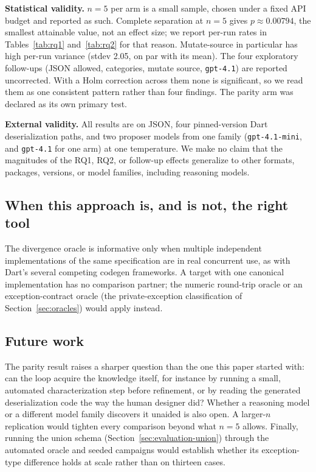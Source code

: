 \textbf{Statistical validity.} $n{=}5$ per arm is a small sample, chosen
under a fixed API budget and reported as such. Complete separation at
$n{=}5$ gives $p \approx 0.00794$, the smallest attainable value, not an
effect size; we report per-run rates in Tables~\ref{tab:rq1}
and~\ref{tab:rq2} for that reason. Mutate-source in particular has high
per-run variance (stdev 2.05, on par with its mean). The four exploratory
follow-ups (JSON allowed, categories, mutate source, \texttt{gpt-4.1}) are
reported uncorrected. With a Holm correction across them none is
significant, so we read them as one consistent pattern rather than four
findings. The parity arm was declared as its own primary test.

\textbf{External validity.} All results are on JSON, four pinned-version
Dart deserialization paths, and two proposer models from one family
(\texttt{gpt-4.1-mini}, and \texttt{gpt-4.1} for one arm) at one
temperature. We make no claim that the magnitudes of the RQ1, RQ2, or
follow-up effects generalize to other formats, packages, versions, or
model families, including reasoning models.

\subsection{When this approach is, and is not, the right tool}
The divergence oracle is informative only when multiple independent
implementations of the same specification are in real concurrent use, as
with Dart's several competing codegen frameworks. A target with one
canonical implementation has no comparison partner; the numeric round-trip
oracle or an exception-contract oracle (the private-exception classification
of Section~\ref{sec:oracles}) would apply instead.

\subsection{Future work}
\label{sec:future-work}
The parity result raises a sharper question than the one this paper started
with: can the loop acquire the knowledge itself, for instance by running a
small, automated characterization step before refinement, or by reading the
generated deserialization code the way the human designer did? Whether a
reasoning model or a different model family discovers it unaided is also
open. A larger-$n$ replication would tighten every comparison beyond what
$n{=}5$ allows. Finally, running the union schema
(Section~\ref{sec:evaluation-union}) through the automated oracle and seeded
campaigns would establish whether its exception-type difference holds at
scale rather than on thirteen cases.
